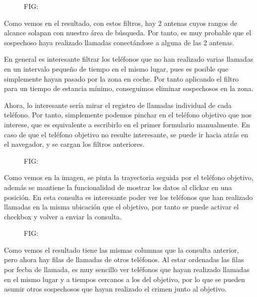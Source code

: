   \begin{figure}[]{FIG:}{}
    \image{}{}{}
  \end{figure}
  Como vemos en el resultado, con estos filtros, hay 2 antenas cuyos rangos de alcance solapan con nuestro área de búsqueda. Por tanto, es muy probable que el sospechoso haya realizado llamadas conectándose a alguna de las 2 antenas.
  
  En general es interesante filtrar los teléfonos que no han realizado varias llamadas en un intervalo pequeño de tiempo en el mismo lugar, pues es posible que simplemente hayan pasado por la zona en coche. Por tanto aplicando el filtro para un tiempo de estancia mínimo, conseguimos eliminar sospechosos en la zona.
  
  Ahora, lo interesante sería mirar el registro de llamadas individual de cada teléfono. Por tanto, simplemente podemos pinchar en el teléfono objetivo que nos interese, que es equivalente a escribirlo en el primer formulario manualmente. En caso de que el teléfono objetivo no resulte interesante, se puede ir hacia atrás en el navegador, y se cargan los filtros anteriores.
  \begin{figure}[]{FIG:}{}
    \image{}{}{}
  \end{figure}
  Como vemos en la imagen, se pinta la trayectoria seguida por el teléfono objetivo, además se mantiene la funcionalidad de mostrar los datos al clickar en una posición. 
  En esta consulta es interesante poder ver los teléfonos que han realizado llamadas en la misma ubicación que el objetivo, por tanto se puede activar el checkbox y volver a enviar la consulta. 
  \begin{figure}[]{FIG:}{}
    \image{}{}{}
  \end{figure}
  Como vemos el resultado tiene las mismas columnas que la consulta anterior, pero ahora hay filas de llamadas de otros teléfonos. 
  Al estar ordenadas las filas por fecba de llamada, es muy sencillo ver teléfonos que hayan realizado llamadas en el mismo lugar y a tiempos cercanos a los del objetivo, por lo que se pueden asumir otros sospechosos que hayan realizado el crimen junto al objetivo.